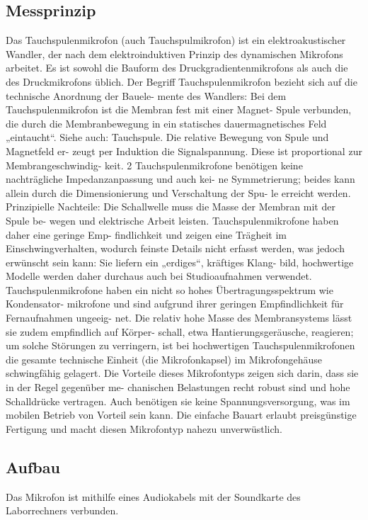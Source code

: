 \documentclass[TGAI_Laborbericht.tex]{subfiles}
\begin{document}
\subsection{Messprinzip}
Das Tauchspulenmikrofon (auch Tauchspulmikrofon) ist ein elektroakustischer Wandler, der
nach dem elektroinduktiven Prinzip des dynamischen Mikrofons arbeitet. Es ist sowohl die
Bauform des Druckgradientenmikrofons als auch die des Druckmikrofons üblich.
Der Begriff Tauchspulenmikrofon bezieht sich auf die technische Anordnung der Bauele-
mente des Wandlers: Bei dem Tauchspulenmikrofon ist die Membran fest mit einer Magnet-
Spule verbunden, die durch die Membranbewegung in ein statisches dauermagnetisches Feld
„eintaucht“. Siehe auch: Tauchspule. Die relative Bewegung von Spule und Magnetfeld er-
zeugt per Induktion die Signalspannung. Diese ist proportional zur Membrangeschwindig-
keit.
2
Tauchspulenmikrofone benötigen keine nachträgliche Impedanzanpassung und auch kei-
ne Symmetrierung; beides kann allein durch die Dimensionierung und Verschaltung der Spu-
le erreicht werden.
Prinzipielle Nachteile: Die Schallwelle muss die Masse der Membran mit der Spule be-
wegen und elektrische Arbeit leisten. Tauchspulenmikrofone haben daher eine geringe Emp-
findlichkeit und zeigen eine Trägheit im Einschwingverhalten, wodurch feinste Details nicht
erfasst werden, was jedoch erwünscht sein kann: Sie liefern ein „erdiges“, kräftiges Klang-
bild, hochwertige Modelle werden daher durchaus auch bei Studioaufnahmen verwendet.
Tauchspulenmikrofone haben ein nicht so hohes Übertragungsspektrum wie Kondensator-
mikrofone und sind aufgrund ihrer geringen Empfindlichkeit für Fernaufnahmen ungeeig-
net. Die relativ hohe Masse des Membransystems lässt sie zudem empfindlich auf Körper-
schall, etwa Hantierungsgeräusche, reagieren; um solche Störungen zu verringern, ist bei
hochwertigen Tauchspulenmikrofonen die gesamte technische Einheit (die Mikrofonkapsel)
im Mikrofongehäuse schwingfähig gelagert.
Die Vorteile dieses Mikrofontyps zeigen sich darin, dass sie in der Regel gegenüber me-
chanischen Belastungen recht robust sind und hohe Schalldrücke vertragen. Auch benötigen
sie keine Spannungsversorgung, was im mobilen Betrieb von Vorteil sein kann. Die einfache
Bauart erlaubt preisgünstige Fertigung und macht diesen Mikrofontyp nahezu unverwüstlich.

\subsection{Aufbau}
Das Mikrofon ist mithilfe eines Audiokabels mit der Soundkarte des Laborrechners verbunden.
\end{document}
